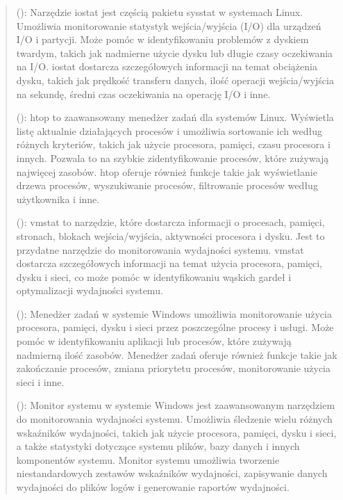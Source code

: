 \documentclass[letterpaper,10pt,polish]{sphinxmanual}
\begin{document}
\begin{enumerate}
\begin{quote}
  (): Narzędzie iostat jest częścią pakietu sysstat w systemach Linux. Umożliwia monitorowanie statystyk wejścia/wyjścia (I/O) dla urządzeń I/O i partycji. Może pomóc w identyfikowaniu problemów z dyskiem twardym, takich jak nadmierne użycie dysku lub długie czasy oczekiwania na I/O. iostat dostarcza szczegółowych informacji na temat obciążenia dysku, takich jak prędkość transferu danych, ilość operacji wejścia/wyjścia na sekundę, średni czas oczekiwania na operację I/O i inne.

  (): htop to zaawansowany menedżer zadań dla systemów Linux. Wyświetla listę aktualnie działających procesów i umożliwia sortowanie ich według różnych kryteriów, takich jak użycie procesora, pamięci, czasu procesora i innych. Pozwala to na szybkie zidentyfikowanie procesów, które zużywają najwięcej zasobów. htop oferuje również funkcje takie jak wyświetlanie drzewa procesów, wyszukiwanie procesów, filtrowanie procesów według użytkownika i inne.

  (): vmstat to narzędzie, które dostarcza informacji o procesach, pamięci, stronach, blokach wejścia/wyjścia, aktywności procesora i dysku. Jest to przydatne narzędzie do monitorowania wydajności systemu. vmstat dostarcza szczegółowych informacji na temat użycia procesora, pamięci, dysku i sieci, co może pomóc w identyfikowaniu wąskich gardeł i optymalizacji wydajności systemu.

  (): Menedżer zadań w systemie Windows umożliwia monitorowanie użycia procesora, pamięci, dysku i sieci przez poszczególne procesy i usługi. Może pomóc w identyfikowaniu aplikacji lub procesów, które zużywają nadmierną ilość zasobów. Menedżer zadań oferuje również funkcje takie jak zakończanie procesów, zmiana priorytetu procesów, monitorowanie użycia sieci i inne.

  (): Monitor systemu w systemie Windows jest zaawansowanym narzędziem do monitorowania wydajności systemu. Umożliwia śledzenie wielu różnych wskaźników wydajności, takich jak użycie procesora, pamięci, dysku i sieci, a także statystyki dotyczące systemu plików, bazy danych i innych komponentów systemu. Monitor systemu umożliwia tworzenie niestandardowych zestawów wskaźników wydajności, zapisywanie danych wydajności do plików logów i generowanie raportów wydajności.
\end{quote}


\end{enumerate}
\end{document}
